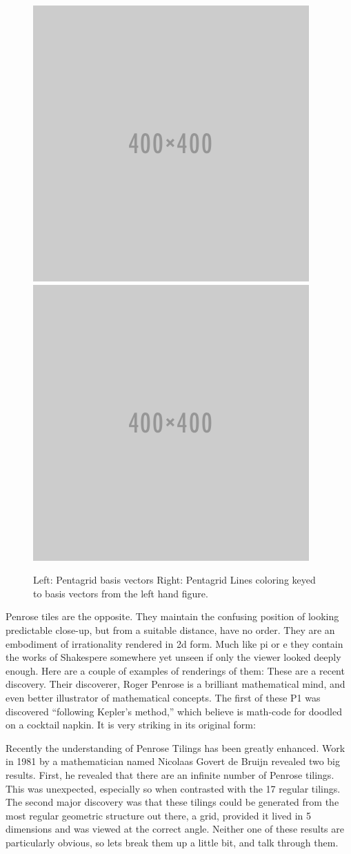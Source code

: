 \documentclass{amsart}
\begin{document}
\begin{figure}[h]
  \centering
  \includegraphics[width=0.4\linewidth]{figures/placeholder}
  \includegraphics[width=0.4\linewidth]{figures/placeholder}
  \caption{Left: Pentagrid basis vectors  Right: Pentagrid Lines coloring keyed to basis vectors from the left hand figure.}
  \label{fig:pentagrid-basis}
\end{figure}


Penrose tiles are the opposite. They maintain the confusing position of looking predictable close-up, but 
from a suitable distance, have no order. They are an embodiment of irrationality rendered in 2d form. 
Much like pi or e they contain the works of Shakespere somewhere yet unseen if only the viewer looked deeply enough. Here are a couple of 
examples of renderings of them:
These are a recent discovery. Their discoverer, Roger Penrose is a brilliant mathematical mind, and 
even better illustrator of mathematical concepts. The first of these P1 was discovered “following Kepler’s method,”
which believe is math-code for doodled on a cocktail napkin. It is very striking in its original form:


Recently the understanding of Penrose Tilings has been greatly enhanced. Work in 1981 by a mathematician 
named Nicolaas Govert de Bruijn revealed two big results. First, he revealed that there are an infinite
number of Penrose tilings. This was unexpected, especially so when contrasted with the 17 regular tilings.
The second major discovery was that these tilings could be generated from the most regular geometric structure
out there, a grid, provided it lived in 5 dimensions and was viewed at the correct angle. Neither one of these
results are particularly obvious, so lets break them up a little bit, and talk through them.
\end{document}
